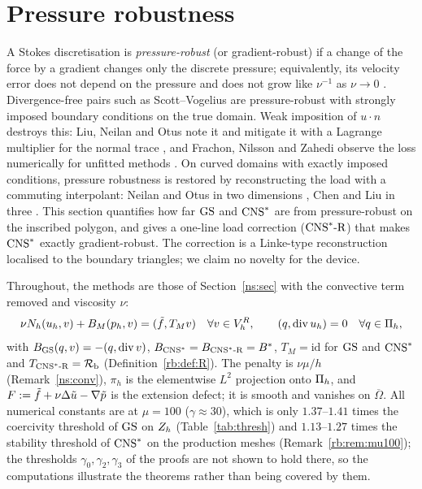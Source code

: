 
\section{Pressure robustness}\label{rb:sec}

A Stokes discretisation is \emph{pressure-robust} (or gradient-robust) if a change of the force by a gradient changes only the discrete pressure; equivalently, its velocity error does not depend on the pressure and does not grow like $\nu^{-1}$ as $\nu\to0$ \cite{JohnEtAl2017}. Divergence-free pairs such as Scott--Vogelius are pressure-robust with strongly imposed boundary conditions on the true domain. Weak imposition of $u\cdot n$ destroys this: Liu, Neilan and Otus note it and mitigate it with a Lagrange multiplier for the normal trace \cite{LiuNeilanOtus2023}, and Frachon, Nilsson and Zahedi observe the loss numerically for unfitted methods \cite{FrachonNilssonZahedi2024}. On curved domains with exactly imposed conditions, pressure robustness is restored by reconstructing the load with a commuting interpolant: Neilan and Otus in two dimensions \cite[Theorem~6.1]{NeilanOtus2021}, Chen and Liu in three \cite{ChenLiu2026}. This section quantifies how far $\mathrm{GS}$ and $\mathrm{CNS}^\ast$ are from pressure-robust on the inscribed polygon, and gives a one-line load correction ($\mathrm{CNS}^\ast\text{-R}$) that makes $\mathrm{CNS}^\ast$ exactly gradient-robust. The correction is a Linke-type reconstruction localised to the boundary triangles; we claim no novelty for the device.

Throughout, the methods are those of Section~\ref{ns:sec} with the convective term removed and viscosity $\nu$:
\[
\nu N_h(u_h,v)+B_M(p_h,v)=(\tilde f,T_Mv)\quad\forall v\in V_h^R,\qquad(q,\operatorname{div} u_h)=0\quad\forall q\in\Pi_h,
\]
with $B_{\mathrm{GS}}(q,v)=-(q,\operatorname{div} v)$, $B_{\mathrm{CNS}^\ast}=B_{\mathrm{CNS}^\ast\text{-R}}=B^\ast$, $T_M=\mathrm{id}$ for $\mathrm{GS}$ and $\mathrm{CNS}^\ast$ and $T_{\mathrm{CNS}^\ast\text{-R}}=\mathcal R_{\mathrm b}$ (Definition~\ref{rb:def:R}). The penalty is $\nu\mu/h$ (Remark~\ref{ns:conv}), $\pi_h$ is the elementwise $L^2$ projection onto $\Pi_h$, and $F:=\tilde f+\nu\Delta\tilde u-\nabla\tilde p$ is the extension defect; it is smooth and vanishes on $\overline\Omega$. All numerical constants are at $\mu=100$ ($\gamma\approx30$), which is only $1.37$--$1.41$ times the coercivity threshold of $\mathrm{GS}$ on $Z_h$ (Table~\ref{tab:thresh}) and $1.13$--$1.27$ times the stability threshold of $\mathrm{CNS}^\ast$ on the production meshes (Remark~\ref{rb:rem:mu100}); the thresholds $\gamma_0,\gamma_2,\gamma_3$ of the proofs are not shown to hold there, so the computations illustrate the theorems rather than being covered by them.

